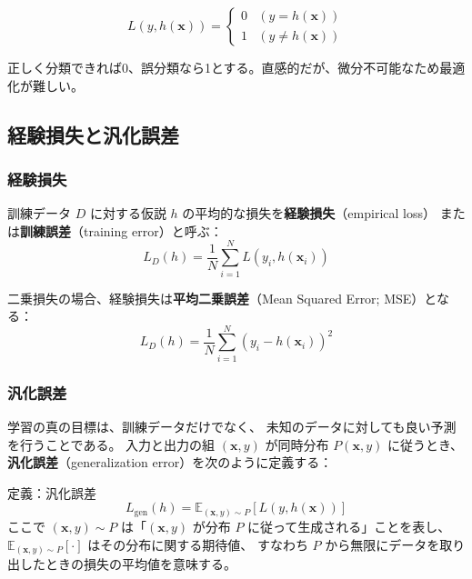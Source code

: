 \begin{equation}
  L(y, h(\bm{x})) =
  \begin{cases}
    0 & (y = h(\bm{x})) \\
    1 & (y \neq h(\bm{x}))
  \end{cases}
\end{equation}

正しく分類できれば0、誤分類なら1とする。直感的だが、微分不可能なため最適化が難しい。


\subsection{経験損失と汎化誤差}

\subsubsection{経験損失}

訓練データ $D$ に対する仮説 $h$ の平均的な損失を\textbf{経験損失}（empirical loss）
または\textbf{訓練誤差}（training error）と呼ぶ：
\begin{equation}
  L_D(h) = \frac{1}{N} \sum_{i=1}^{N} L(y_i, h(\bm{x}_i))
\end{equation}

二乗損失の場合、経験損失は\textbf{平均二乗誤差}（Mean Squared Error; MSE）となる：
\begin{equation}
  L_D(h) = \frac{1}{N} \sum_{i=1}^{N} (y_i - h(\bm{x}_i))^2
\end{equation}

\subsubsection{汎化誤差}

学習の真の目標は、訓練データだけでなく、
未知のデータに対しても良い予測を行うことである。
入力と出力の組 $(\bm{x}, y)$ が同時分布 $P(\bm{x}, y)$ に従うとき、
\textbf{汎化誤差}（generalization error）を次のように定義する：

\begin{itembox}[l]{定義：汎化誤差}
\begin{equation}
  L_{\mathrm{gen}}(h) = \mathbb{E}_{(\bm{x}, y) \sim P} \left[ L(y, h(\bm{x})) \right]
\end{equation}
ここで $(\bm{x}, y) \sim P$ は「$(\bm{x}, y)$ が分布 $P$ に従って生成される」ことを表し、
$\mathbb{E}_{(\bm{x}, y) \sim P}[\cdot]$ はその分布に関する期待値、
すなわち $P$ から無限にデータを取り出したときの損失の平均値を意味する。
\end{itembox}

